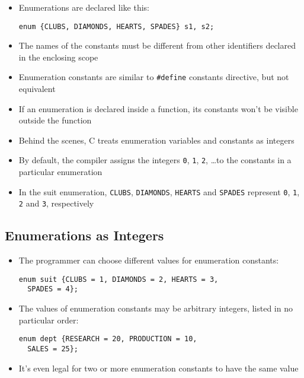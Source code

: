 \documentclass{article}
\begin{document}
\begin{itemize}
\item Enumerations are declared like this:
\begin{verbatim}
enum {CLUBS, DIAMONDS, HEARTS, SPADES} s1, s2;
\end{verbatim}
\item The names of the constants must  be different from other identifiers declared in the enclosing scope
\item Enumeration constants are similar to \verb!#define! constants directive, but not equivalent
\item If an enumeration is declared inside a function, its constants won't be visible outside the function
\end{itemize}


\begin{itemize}
\item Behind the scenes, C treats enumeration variables and constants as integers

\item By default, the compiler assigns the integers \verb!0!, \verb!1!, \verb!2!, \ldots to the constants in a particular enumeration

\item In the suit enumeration, \verb!CLUBS!, \verb!DIAMONDS!, \verb!HEARTS! and \verb!SPADES! represent \verb!0!, \verb!1!, \verb!2! and \verb!3!, respectively
\end{itemize}

\subsection{Enumerations as Integers}
\begin{itemize}
\item The programmer can choose different values for enumeration constants:
\begin{verbatim}
enum suit {CLUBS = 1, DIAMONDS = 2, HEARTS = 3,
  SPADES = 4};
\end{verbatim}

\item The values of enumeration constants may be arbitrary integers, listed in no particular order:
\begin{verbatim}
enum dept {RESEARCH = 20, PRODUCTION = 10,
  SALES = 25};
\end{verbatim}

\item It's even legal for two or more enumeration constants to have the same value
\end{itemize}
\end{document}
